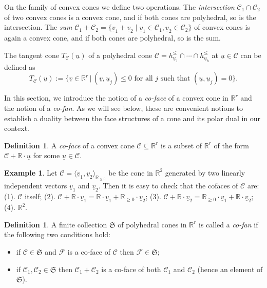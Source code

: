 \documentclass[12pt, a4article]{amsart}   	%
\numberwithin{equation}{section}
\theoremstyle{plain}
\theoremstyle{definition}
\newtheorem{example}[theorem]{Example}
\newtheorem{definition}[theorem]{Definition}
\newcommand{\R}{{\mathbb R}}
\newcommand{\mcC}{{\mathcal C}}
\newcommand{\mcF}{{\mathcal F}}
\newcommand{\mfS}{{\mathfrak S}}
\newcommand{\uu}{{\underline u}}
\newcommand{\uv}{{\underline v}}
\begin{document}
On the family of convex cones we define two operations. The \emph{intersection} $\mcC_1\cap \mcC_2$ of two convex cones is a convex cone, and if both cones are polyhedral, so is the intersection. The \emph{sum} $\mcC_1 + \mcC_2 = \{\uv_1 + \uv_2 \mid  \uv_1\in \mcC_1, \uv_2 \in \mcC_2\}$ of convex cones is again a convex cone, and if both cones are polyhedral, so is the sum.

The tangent cone $T_\mcC(\uu)$ of a polyhedral cone $\mcC=h_{ {\uu_1}}^\leq\cap \cdots\cap h_{ {\uu_k}}^\leq$ at $\uu\in\mcC$ can be defined as
\[
T_{\mcC}(\uu) := \{ \uv \in \mathbb{R}^r\,|\, (\uv,\uu_j)\leq 0 \textrm{ for all } j \textrm{ such that } (\uu, \uu_j) = 0 \}.
\]

\smallskip

In this section, we introduce the notion of a \emph{co-face} of a convex cone in $\R^r$ and the notion of a \emph{co-fan}. As we will see below, these are convenient notions to establish a duality between the face structures of a cone and its polar dual in our context.

\begin{definition}\label{s2_def:coface}
A \emph{co-face} of a convex cone $\mcC\subseteq \mathbb{R}^r$ is a subset of $\R^r$ of the form $\mcC+\R\cdot\uu$ for some $\uu\in\mcC$.
\end{definition}

\begin{example}
Let $\mcC=\langle \uv_1, \uv_2\rangle_{\R_{\geq0}}$ be the cone in $\R^2$ generated by two linearly independent vectors $\uv_1$ and $\uv_2$. Then it is easy to check that the cofaces of $\mcC$ are: (1). $\mcC$ itself; (2). $\mcC+\R\cdot\uv_1 = \R\cdot\uv_1 + \R_{\geq0}\cdot\uv_2$; (3). $\mcC+\R\cdot\uv_2 = \R_{\geq0}\cdot\uv_1 + \R\cdot\uv_2$; (4). $\R^2$.
\end{example}

\begin{definition}
A finite collection $\mfS$ of polyhedral cones in $\R^r$ is called a \emph{co-fan} if the following two conditions hold:
\begin{itemize}
\item[(1)] if $\mcC\in\mfS$ and $\mcF$ is a co-face of $\mcC$ then $\mcF\in\mfS$;
\item[(2)] if $\mcC_1,\mcC_2\in\mfS$ then $\mcC_1 + \mcC_2$ is a co-face of both $\mcC_1$ and $\mcC_2$ (hence an element of $\mfS$). 
\end{itemize}
\end{definition}
\end{document}
